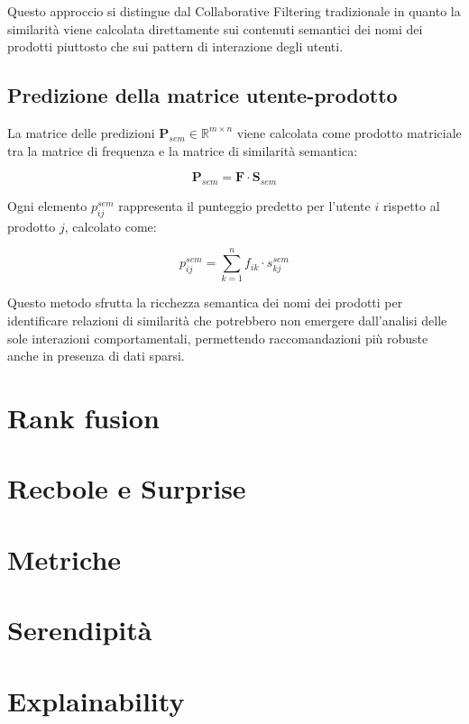 Questo approccio si distingue dal Collaborative Filtering tradizionale in quanto la similarità viene calcolata direttamente sui contenuti semantici dei nomi dei prodotti piuttosto che sui pattern di interazione degli utenti.

\subsection{Predizione della matrice utente-prodotto}

La matrice delle predizioni $\mathbf{P}_{sem} \in \mathbb{R}^{m \times n}$ viene calcolata come prodotto matriciale tra la matrice di frequenza e la matrice di similarità semantica:

\begin{equation}
\mathbf{P}_{sem} = \mathbf{F} \cdot \mathbf{S}_{sem}
\end{equation}

Ogni elemento $p_{ij}^{sem}$ rappresenta il punteggio predetto per l'utente $i$ rispetto al prodotto $j$, calcolato come:

\begin{equation}
p_{ij}^{sem} = \sum_{k=1}^{n} f_{ik} \cdot s_{kj}^{sem}
\end{equation}

Questo metodo sfrutta la ricchezza semantica dei nomi dei prodotti per identificare relazioni di similarità che potrebbero non emergere dall'analisi delle sole interazioni comportamentali, permettendo raccomandazioni più robuste anche in presenza di dati sparsi.


\section{Rank fusion}

\section{Recbole e Surprise}

\section{Metriche}

\section{Serendipità}

\section{Explainability}
